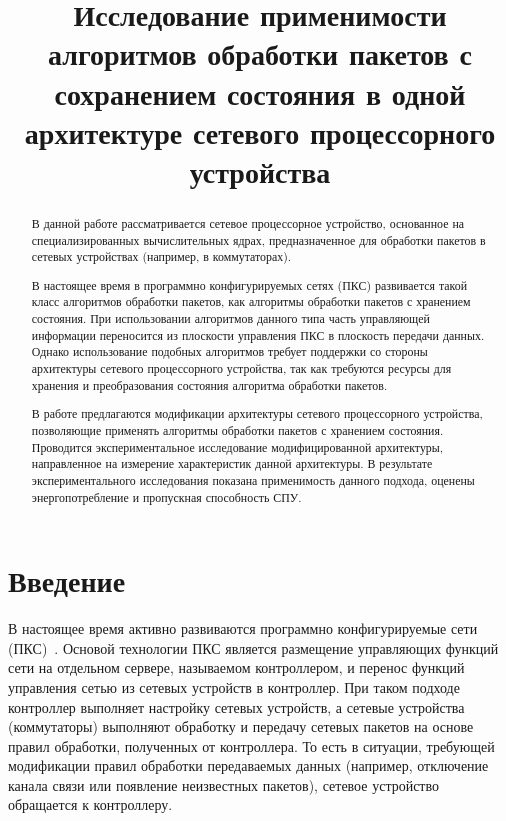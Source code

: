 \documentclass[conference]{IEEEtran}
\begin{document}
\title{
Исследование применимости алгоритмов обработки пакетов с сохранением
состояния в одной архитектуре сетевого процессорного устройства\\
}

\maketitle

\begin{abstract}
В данной работе рассматривается сетевое процессорное устройство,
основанное на специализированных вычислительных ядрах,
предназначенное для обработки пакетов в сетевых устройствах (например,
в коммутаторах).

В настоящее время в программно конфигурируемых сетях (ПКС) развивается
такой класс алгоритмов обработки пакетов, как алгоритмы обработки
пакетов с хранением состояния. При использовании алгоритмов данного типа
часть управляющей информации переносится из плоскости управления ПКС
в плоскость передачи данных. Однако использование подобных алгоритмов
требует поддержки со стороны архитектуры сетевого процессорного устройства,
так как требуются ресурсы для хранения и преобразования состояния
алгоритма обработки пакетов.

В работе предлагаются модификации архитектуры сетевого процессорного
устройства, позволяющие применять алгоритмы обработки пакетов с хранением
состояния. Проводится экспериментальное исследование модифицированной
архитектуры, направленное на измерение характеристик данной
архитектуры. В результате экспериментального исследования
показана применимость данного подхода, оценены энергопотребление и
пропускная способность СПУ.
\end{abstract}


\section{Введение}
В настоящее время активно развиваются программно конфигурируемые
сети (ПКС)~\cite{bib:Smelyanskiy:SDN}. Основой технологии ПКС является
размещение управляющих функций
сети на отдельном сервере, называемом контроллером, и перенос функций
управления сетью из сетевых устройств в контроллер. При таком подходе
контроллер выполняет настройку сетевых
устройств, а сетевые устройства (коммутаторы) выполняют
обработку и передачу сетевых пакетов на
основе правил обработки, полученных от контроллера. То есть в ситуации,
требующей модификации правил обработки передаваемых данных (например,
отключение канала связи или появление неизвестных пакетов), сетевое
устройство обращается к контроллеру.
\end{document}
